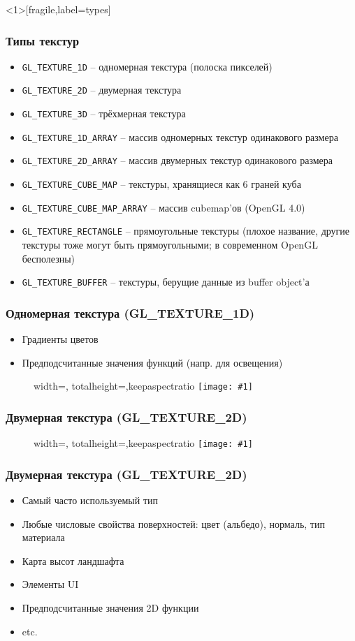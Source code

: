 \documentclass{beamer}
\newcommand{\slideimage}[1]{
  \begin{figure}
    \begin{adjustbox}{width=\textwidth, totalheight=\textheight-2\baselineskip-2\baselineskip,keepaspectratio}
      \texttt{[image: \#1]}
    \end{adjustbox}
  \end{figure}
}
\begin{document}
\begin{frame}<1>[fragile,label=types]
\frametitle{Типы текстур}
\begin{itemize}
\item \verb|GL_TEXTURE_1D| -- одномерная текстура (полоска пикселей)
\pause
\item \verb|GL_TEXTURE_2D| -- двумерная текстура
\pause
\item \verb|GL_TEXTURE_3D| -- трёхмерная текстура
\pause
\item \verb|GL_TEXTURE_1D_ARRAY| -- массив одномерных текстур одинакового размера
\pause
\item \verb|GL_TEXTURE_2D_ARRAY| -- массив двумерных текстур одинакового размера
\pause
\item \verb|GL_TEXTURE_CUBE_MAP| -- текстуры, хранящиеся как 6 граней куба
\pause
\item \verb|GL_TEXTURE_CUBE_MAP_ARRAY| -- массив cubemap'ов (OpenGL 4.0)
\pause
\item \verb|GL_TEXTURE_RECTANGLE| -- прямоугольные текстуры \pause (плохое название, другие текстуры тоже могут быть прямоугольными; в современном OpenGL бесполезны)
\pause
\item \verb|GL_TEXTURE_BUFFER| -- текстуры, берущие данные из buffer object'а
\end{itemize}
\end{frame}

\begin{frame}[fragile]
\frametitle{Одномерная текстура (GL\_TEXTURE\_1D)}
\begin{itemize}
\item Градиенты цветов
\item Предподсчитанные значения функций (напр. для освещения)
\end{itemize}
\slideimage{texture_1d.png}
\end{frame}


\begin{frame}[fragile]
\frametitle{Двумерная текстура (GL\_TEXTURE\_2D)}
\slideimage{texture_2d.jpg}
\end{frame}

\begin{frame}[fragile]
\frametitle{Двумерная текстура (GL\_TEXTURE\_2D)}
\begin{itemize}
\item Самый часто используемый тип
\item Любые числовые свойства поверхностей: цвет (альбедо), нормаль, тип материала
\item Карта высот ландшафта
\item Элементы UI
\item Предподсчитанные значения 2D функции
\item etc.
\end{itemize}
\end{frame}
\end{document}
